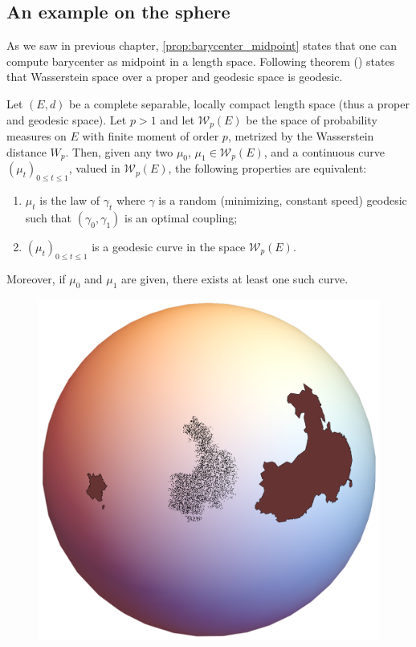 \subsection{An example on the sphere}

As we saw in previous chapter,
\cref{prop:barycenter_midpoint} states that one can compute barycenter as midpoint in a length space.
Following theorem (\cite[Corollary 7.22]{villani2008optimal}) states that Wasserstein space over a proper and geodesic space is geodesic.

\begin{thm}
	\label{thm:geodesic_Wasserstein_space}
	Let \( ( E , d ) \) be a complete separable, locally compact length space (thus a proper and geodesic space).
	Let \( p > 1 \) and let \( \mathcal{W}_p(E) \) be the space of probability measures
	on \( E \) with finite moment of order \( p \),
	metrized by the Wasserstein distance \( W _ { p } \).
	Then, given any two \( \mu _ { 0 }\), \( \mu _ { 1 } \in \mathcal{W}_p(E) \),
	and a continuous curve \( \left( \mu _ { t } \right) _ { 0 \leq t \leq 1 } \),
	valued in \( \mathcal{W}_p(E) \),
	the following properties are equivalent:
	\begin{enumerate}
		\item \( \mu _ { t } \) is the law of \(\gamma _ { t } \) where \( \gamma \) is a random (minimizing, constant speed)
		      geodesic such that \( \left( \gamma _ { 0 } , \gamma _ { 1 } \right) \) is an optimal coupling;
		\item \( \left( \mu _ { t } \right) _ { 0 \leq t \leq 1 } \) is a geodesic curve in the space \( \mathcal{W}_p(E) \).
	\end{enumerate}
	Moreover, if \( \mu _ { 0 } \) and \( \mu _ { 1 } \) are given, there exists at least one such curve.
\end{thm}

\begin{figure}
	\includegraphics[width=\linewidth]{Chapters/OPT_sphere.pdf}
\end{figure}

